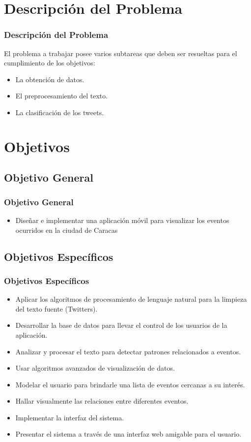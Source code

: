 \documentclass{beamer}
\begin{document}
\section{Descripci\'{o}n del Problema} 
\begin{frame}
\frametitle{Descripci\'{o}n del Problema}
El problema a trabajar posee varios subtareas que deben ser resueltas para el cumplimiento de los objetivos: 
\begin{itemize}
\item La obtenci\'{o}n de datos.
\item El preprocesamiento del texto.
\item La clasificaci\'{o}n de los tweets.
\end{itemize}
\end{frame}
\section{Objetivos} 

\subsection{Objetivo General}
\begin{frame}
\frametitle{Objetivo General}
\begin{itemize}
\item Dise\~{n}ar e implementar una aplicaci\'{o}n m\'{o}vil para visualizar los eventos ocurridos en la ciudad de Caracas
\end{itemize}
\end{frame}

\subsection{Objetivos Espec\'{i}ficos}
\begin{frame}
\frametitle{Objetivos Espec\'{i}ficos}
\begin{itemize}
\item Aplicar los algoritmos de procesamiento de lenguaje natural para la limpieza del texto fuente
(Twitters).
\item Desarrollar la base de datos para llevar el control de los usuarios de la aplicaci\'{o}n.
\item Analizar y procesar el texto para detectar patrones relacionados a eventos.
\item Usar algoritmos avanzados de visualizaci\'{o}n de datos.
\item Modelar el usuario para brindarle una lista de eventos cercanas a su inter\'{e}s.
\item Hallar visualmente las relaciones entre diferentes eventos.
\item Implementar la interfaz del sistema.
\item Presentar el sistema a trav\'{e}s de una interfaz web amigable para el usuario.
\end{itemize}

\end{frame}
\end{document}
